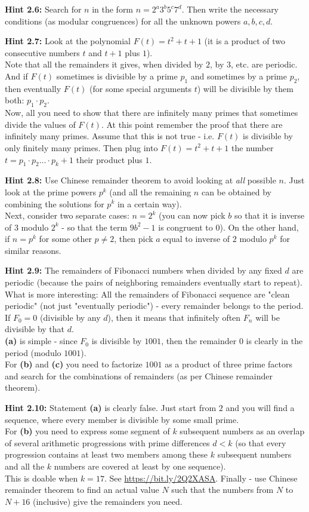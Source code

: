 \documentclass[jou]{apa6}
\begin{document}
{\bf Hint 2.6:} Search for $n$ in the form $n = 2^a3^b5^c7^d$. 
Then write the necessary conditions (as modular congruences) for all 
the unknown powers $a,b,c,d$. 

{\bf Hint 2.7:} Look at the polynomial $F(t) = t^2 + t + 1$ (it is 
a product of two consecutive numbers $t$ and $t+1$ plus $1$).\\
Note that all the remainders it gives, when divided by $2$, by $3$, etc. 
are periodic. And if $F(t)$ sometimes is divisible by a prime $p_1$ and
sometimes by a prime $p_2$, then eventually $F(t)$ (for some special 
arguments $t$) will be divisible by them both: $p_1 \cdot p_2$.\\
Now, all you need to show that there are infinitely many primes that 
sometimes divide the values of $F(t)$. At this point remember
the proof that there are infinitely many primes. Assume that this is not true - 
i.e. $F(t)$ is divisible by only finitely many primes. Then plug into 
$F(t)=t^2 + t + 1$ the number 
$t = p_1\cdot{}p_2\ldots{}\cdot{}p_k+1$ their product plus $1$.

{\bf Hint 2.8:} Use Chinese remainder theorem to avoid looking at {\em all} possible
$n$. Just look at the prime powers $p^k$ (and all the remaining $n$ can be 
obtained by combining the solutions for $p^k$ in a certain way).\\
Next, consider two separate cases: $n = 2^k$ (you can now pick $b$
so that it is inverse of $3$ modulo $2^k$ - so that the term $9b^2 - 1$
is congruent to $0$). On the other hand, if $n=p^k$ for some other $p \neq 2$, 
then pick $a$ equal to inverse of $2$ modulo $p^k$ for similar reasons.

{\bf Hint 2.9:} The remainders of Fibonacci numbers when divided by any fixed $d$
are periodic (because the pairs of neighboring remainders eventually 
start to repeat). What is more interesting: All the remainders of Fibonacci sequence
are "clean periodic" (not just "eventually periodic") - every remainder belongs to 
the period. If $F_0 = 0$ (divisible by any $d$), then it means that infinitely 
often $F_n$ will be divisible by that $d$.\\
{\bf (a)} is simple - since $F_0$ is divisible by $1001$, then the remainder $0$
is clearly in the period (modulo $1001$).\\
For {\bf (b)} and {\bf (c)} you need to factorize $1001$ as a product of three prime
factors and search for the combinations of remainders (as per Chinese remainder
theorem). 

{\bf Hint 2.10:} Statement {\bf (a)} is clearly false. Just start from $2$ and you
will find a sequence, where every member is divisible by some small prime.\\
For {\bf (b)} you need to express some segment of $k$ subsequent numbers as an overlap 
of several arithmetic progressions with prime differences $d < k$
(so that every progression contains at least two members among these $k$ subsequent 
numbers and all the $k$ numbers are covered at least by one sequence).\\
This is doable when $k=17$. See \url{https://bit.ly/2Q2XASA}. Finally - use 
Chinese remainder theorem to find an actual value $N$ such that the numbers
from $N$ to $N+16$ (inclusive) give the remainders you need.
\end{document}
